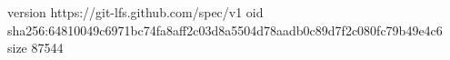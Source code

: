 version https://git-lfs.github.com/spec/v1
oid sha256:64810049c6971bc74fa8aff2c03d8a5504d78aadb0c89d7f2c080fc79b49e4c6
size 87544
